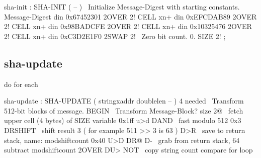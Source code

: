\begin{chunk}{sha-init}
: SHA-INIT          ( -- )
    \  Initialize Message-Digest with starting constants.
    Message-Digest
        din 0x67452301 2OVER 2! CELL xn+
        din 0xEFCDAB89 2OVER 2! CELL xn+
        din 0x98BADCFE 2OVER 2! CELL xn+
        din 0x10325476 2OVER 2! CELL xn+
        din 0xC3D2E1F0 2SWAP 2!
    \  Zero bit count.
    0. SIZE 2! ;

\end{chunk}

\subsection{sha-update}
do for each 
\begin{chunk}{sha-update}
: SHA-UPDATE ( stringxaddr doublelen -- )
   4 needed
                         \ Transform 512-bit blocks of message.
    BEGIN                \ Transform Message-Block?
        size 2@          \ fetch upper cell (4 bytes) of SIZE variable
        0x1ff u>d DAND   \ fast modulo 512
        0x3 DRSHIFT      \ shift result 3 ( for example 511 >> 3 is 63 )
        D>R              \ save to return stack, name: modshiftcount
        0x40 U>D DR@ D-  \ grab from return stack, 64 subtract modshiftcount
        2OVER DU> NOT    \ copy string count compare for loop
        

\end{chunk}
